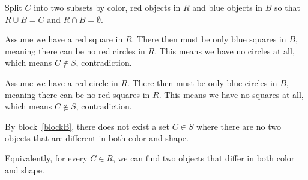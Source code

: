 \documentclass[11pt]{article}
\begin{document}
\begin{problems}
\begin{longFormProof}
\begin{block}[blockB]
    \step Split $C$ into two subsets by color, red objects in $R$ and blue objects in  $B$ so that $R \cup B = C$ and $R \cap B = \emptyset$.

    \step Assume we have a red square in $R$. There then must be only blue squares in $B$, meaning there can be no red circles in $R$. This means we have no circles at all, which means $C \not\in S$, contradiction.

    \step Assume we have a red circle in $R$. There then must be only blue circles in $B$, meaning there can be no red squares in $R$. This means we have no squares at all, which means $C \not\in S$, contradiction.

  \end{block}
  
  \step By block~\ref{blockB},
  there does not exist a set $C \in S$ where there are no two objects that are different in both color and shape.

  \step Equivalently, for every $C \in R$, we can find two objects that differ in both color and shape.
\end{longFormProof}
\end{problems}
\end{document}
